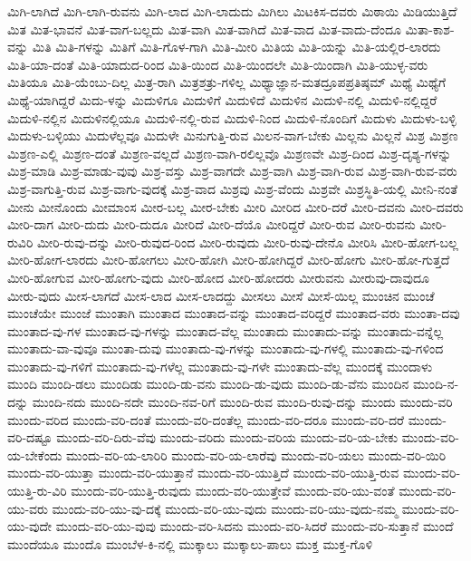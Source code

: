 {ಮಿಗಿ-ಲಾಗಿದೆ
ಮಿಗಿ-ಲಾಗಿ-ರುವನು
ಮಿಗಿ-ಲಾದ
ಮಿಗಿ-ಲಾದುದು
ಮಿಗಿಲು
ಮಿಟಕಿಸ-ದವರು
ಮಿಠಾಯಿ
ಮಿಡಿಯುತ್ತಿದೆ
ಮಿತ
ಮಿತ-ಭಾವನೆ
ಮಿತ-ವಾಗ-ಬಲ್ಲದು
ಮಿತ-ವಾಗಿ
ಮಿತ-ವಾಗಿದೆ
ಮಿತ-ವಾದ
ಮಿತ-ವಾದು-ದೆಂದೂ
ಮಿತಾ-ಕಾಶ-ವನ್ನು
ಮಿತಿ
ಮಿತಿ-ಗಳನ್ನು
ಮಿತಿಗೆ
ಮಿತಿ-ಗೊಳ-ಗಾಗಿ
ಮಿತಿ-ಮೀರಿ
ಮಿತಿಯ
ಮಿತಿ-ಯನ್ನು
ಮಿತಿ-ಯಲ್ಲಿರ-ಲಾರದು
ಮಿತಿ-ಯಾ-ದಂತೆ
ಮಿತಿ-ಯಾದುದ-ರಿಂದ
ಮಿತಿ-ಯಿಂದ
ಮಿತಿ-ಯಿಂದಲೇ
ಮಿತಿ-ಯಿಂದಾಗಿ
ಮಿತಿ-ಯುಳ್ಳ-ವರು
ಮಿತಿಯೂ
ಮಿತಿ-ಯೆಂಬು-ದಿಲ್ಲ
ಮಿತ್ರ-ರಾಗಿ
ಮಿತ್ರಶತ್ರು-ಗಳಿಲ್ಲ
ಮಿಥ್ಯಾಜ್ಞಾನ-ಮತದ್ರೂಪಪ್ರತಿಷ್ಠಮ್
ಮಿಥ್ಯೆ
ಮಿಥ್ಯೆಗೆ
ಮಿಥ್ಯೆ-ಯಾಗಿದ್ದರೆ
ಮಿದು-ಳನ್ನು
ಮಿದುಳಿಗೂ
ಮಿದುಳಿಗೆ
ಮಿದುಳಿದೆ
ಮಿದುಳಿನ
ಮಿದುಳಿ-ನಲ್ಲಿ
ಮಿದುಳಿ-ನಲ್ಲಿದ್ದರೆ
ಮಿದುಳಿ-ನಲ್ಲಿನ
ಮಿದುಳಿನಲ್ಲಿಯೂ
ಮಿದುಳಿ-ನಲ್ಲಿ-ರುವ
ಮಿದುಳಿ-ನಿಂದ
ಮಿದುಳಿ-ನೊಂದಿಗೆ
ಮಿದುಳು
ಮಿದುಳು-ಬಳ್ಳಿ
ಮಿದುಳು-ಬಳ್ಳಿಯು
ಮಿದುಳೆಲ್ಲವೂ
ಮಿದುಳೇ
ಮಿನುಗುತ್ತಿ-ರುವ
ಮಿಲನ-ವಾಗ-ಬೇಕು
ಮಿಲ್ಲನು
ಮಿಲ್ಲನೆ
ಮಿಶ್ರ
ಮಿಶ್ರಣ
ಮಿಶ್ರಣ-ಎಲ್ಲಿ
ಮಿಶ್ರಣ-ದಂತೆ
ಮಿಶ್ರಣ-ವಲ್ಲದೆ
ಮಿಶ್ರಣ-ವಾಗಿ-ರಲಿಲ್ಲವೊ
ಮಿಶ್ರಣವೇ
ಮಿಶ್ರ-ದಿಂದ
ಮಿಶ್ರ-ದೃಶ್ಯ-ಗಳನ್ನು
ಮಿಶ್ರ-ಮಾಡಿ
ಮಿಶ್ರ-ಮಾಡು-ವುವು
ಮಿಶ್ರ-ವಸ್ತು
ಮಿಶ್ರ-ವಾಗದೇ
ಮಿಶ್ರ-ವಾಗಿ
ಮಿಶ್ರ-ವಾಗಿ-ರುವ
ಮಿಶ್ರ-ವಾಗಿ-ರುವ-ವರು
ಮಿಶ್ರ-ವಾಗುತ್ತಿ-ರುವ
ಮಿಶ್ರ-ವಾಗು-ವುದಕ್ಕೆ
ಮಿಶ್ರ-ವಾದ
ಮಿಶ್ರವು
ಮಿಶ್ರ-ವೆಂದು
ಮಿಶ್ರವೇ
ಮಿಶ್ರಸ್ಥಿತಿ-ಯಲ್ಲಿ
ಮೀನಿ-ನಂತೆ
ಮೀನು
ಮೀನೊಂದು
ಮೀಮಾಂಸ
ಮೀರ-ಬಲ್ಲ
ಮೀರ-ಬೇಕು
ಮೀರಿ
ಮೀರಿದ
ಮೀರಿ-ದರೆ
ಮೀರಿ-ದವನು
ಮೀರಿ-ದವರು
ಮೀರಿ-ದಾಗ
ಮೀರಿ-ದುದು
ಮೀರಿ-ದುದೂ
ಮೀರಿದೆ
ಮೀರಿ-ದೆಯೊ
ಮೀರಿದ್ದರೆ
ಮೀರಿ-ರುವ
ಮೀರಿ-ರುವನು
ಮೀರಿ-ರುವಿರಿ
ಮೀರಿ-ರುವು-ದನ್ನು
ಮೀರಿ-ರುವುದ-ರಿಂದ
ಮೀರಿ-ರುವುದು
ಮೀರಿ-ರುವು-ದೇನೊ
ಮೀರಿಸಿ
ಮೀರಿ-ಹೋಗ-ಬಲ್ಲ
ಮೀರಿ-ಹೋಗ-ಲಾರದು
ಮೀರಿ-ಹೋಗಲು
ಮೀರಿ-ಹೋಗಿ
ಮೀರಿ-ಹೋಗಿದ್ದರೆ
ಮೀರಿ-ಹೋಗು
ಮೀರಿ-ಹೋ-ಗುತ್ತದೆ
ಮೀರಿ-ಹೋಗುವ
ಮೀರಿ-ಹೋಗು-ವುದು
ಮೀರಿ-ಹೋದ
ಮೀರಿ-ಹೋದರು
ಮೀರುವನು
ಮೀರುವು-ದಾವುದೂ
ಮೀರು-ವುದು
ಮೀಸ-ಲಾಗದೆ
ಮೀಸ-ಲಾದ
ಮೀಸ-ಲಾದದ್ದು
ಮೀಸಲು
ಮೀಸೆ
ಮೀಸೆ-ಯಿಲ್ಲ
ಮುಂಚಿನ
ಮುಂಚೆ
ಮುಂಚೆಯೇ
ಮುಂಜೆ
ಮುಂತಾಗಿ
ಮುಂತಾದ
ಮುಂತಾದ-ವನ್ನು
ಮುಂತಾದ-ವರಿದ್ದರೆ
ಮುಂತಾದ-ವರು
ಮುಂತಾ-ದವು
ಮುಂತಾದ-ವು-ಗಳ
ಮುಂತಾದ-ವು-ಗಳನ್ನು
ಮುಂತಾದ-ವೆಲ್ಲ
ಮುಂತಾದು
ಮುಂತಾದು-ವನ್ನು
ಮುಂತಾದು-ವನ್ನೆಲ್ಲ
ಮುಂತಾದು-ವಾ-ವುವೂ
ಮುಂತಾ-ದುವು
ಮುಂತಾದು-ವು-ಗಳನ್ನು
ಮುಂತಾದು-ವು-ಗಳಲ್ಲಿ
ಮುಂತಾದು-ವು-ಗಳಿಂದ
ಮುಂತಾದು-ವು-ಗಳಿಗೆ
ಮುಂತಾದು-ವು-ಗಳೆಲ್ಲ
ಮುಂತಾದು-ವು-ಗಳೇ
ಮುಂತಾದು-ವೆಲ್ಲ
ಮುಂದಕ್ಕೆ
ಮುಂದಾಳು
ಮುಂದಿ
ಮುಂದಿ-ಡಲು
ಮುಂದಿಡು
ಮುಂದಿ-ಡು-ವನು
ಮುಂದಿ-ಡು-ವುದು
ಮುಂದಿ-ಡು-ವೆನು
ಮುಂದಿನ
ಮುಂದಿ-ನ-ದನ್ನು
ಮುಂದಿ-ನದು
ಮುಂದಿ-ನದೇ
ಮುಂದಿ-ನವ-ರಿಗೆ
ಮುಂದಿ-ರುವ
ಮುಂದಿ-ರುವು-ದನ್ನು
ಮುಂದು
ಮುಂದು-ವರಿ
ಮುಂದು-ವರಿದ
ಮುಂದು-ವರಿ-ದಂತೆ
ಮುಂದು-ವರಿ-ದಂತೆಲ್ಲ
ಮುಂದು-ವರಿ-ದರೂ
ಮುಂದು-ವರಿ-ದರೆ
ಮುಂದು-ವರಿ-ದಷ್ಟೂ
ಮುಂದು-ವರಿ-ದಿರು-ವೆವು
ಮುಂದು-ವರಿದು
ಮುಂದು-ವರಿಯ
ಮುಂದು-ವರಿ-ಯ-ಬೇಕು
ಮುಂದು-ವರಿ-ಯ-ಬೇಕೆಂದು
ಮುಂದು-ವರಿ-ಯ-ಲಾರಿರಿ
ಮುಂದು-ವರಿ-ಯ-ಲಾರೆವು
ಮುಂದು-ವರಿ-ಯಲು
ಮುಂದು-ವರಿ-ಯಿರಿ
ಮುಂದು-ವರಿ-ಯುತ್ತಾ
ಮುಂದು-ವರಿ-ಯುತ್ತಾನೆ
ಮುಂದು-ವರಿ-ಯುತ್ತಿದೆ
ಮುಂದು-ವರಿ-ಯುತ್ತಿ-ರುವ
ಮುಂದು-ವರಿ-ಯುತ್ತಿ-ರು-ವಿರಿ
ಮುಂದು-ವರಿ-ಯುತ್ತಿ-ರುವುದು
ಮುಂದು-ವರಿ-ಯುತ್ತೇವೆ
ಮುಂದು-ವರಿ-ಯು-ವಂತೆ
ಮುಂದು-ವರಿ-ಯು-ವರು
ಮುಂದು-ವರಿ-ಯು-ವು-ದಕ್ಕೆ
ಮುಂದು-ವರಿ-ಯು-ವುದು
ಮುಂದು-ವರಿ-ಯು-ವುದು-ನಮ್ಮ
ಮುಂದು-ವರಿ-ಯು-ವುದೇ
ಮುಂದು-ವರಿ-ಯು-ವುವು
ಮುಂದು-ವರಿ-ಸಿದನು
ಮುಂದು-ವರಿ-ಸಿದರೆ
ಮುಂದು-ವರಿ-ಸುತ್ತಾನೆ
ಮುಂದೆ
ಮುಂದೆಯೂ
ಮುಂದೊ
ಮುಂಬೆಳ-ಕಿ-ನಲ್ಲಿ
ಮುಕ್ಕಾಲು
ಮುಕ್ಕಾಲು-ಪಾಲು
ಮುಕ್ತ
ಮುಕ್ತ-ಗೊಳಿ
}
